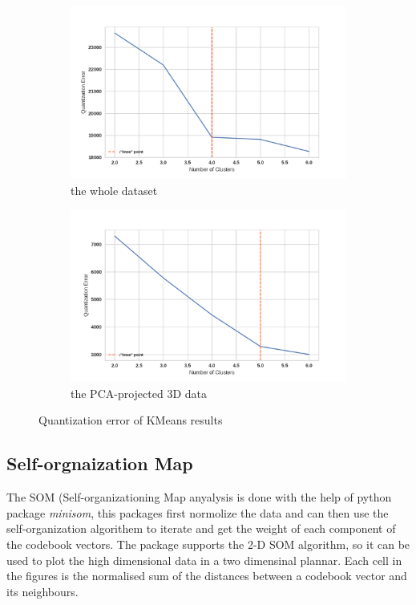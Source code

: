 \documentclass[12pt]{article}
\begin{document}
\begin{figure}
    \centering
    \begin{subfigure}[b]{0.47\textwidth}
        \includegraphics[width=\textwidth]{images/cluster-err1.png}
        \caption{the whole dataset}
        \label{fig:cluster-err1}
    \end{subfigure}
    \begin{subfigure}[b]{0.47\textwidth}
        \includegraphics[width=\textwidth]{images/cluster-err2.png}
        \caption{the PCA-projected 3D data}
        \label{fig:cluster-err2}
    \end{subfigure}
    \caption{Quantization error of KMeans results}\label{fig:cluster-err}
\end{figure} 
\subsection{Self-orgnaization Map}
The SOM (Self-organizationing Map anyalysis is done with the help of python package \textit{minisom}\cite{justglowing/minisom_2017}, this packages first normolize the data and can then use the self-organization algorithem to iterate and get the weight of each component of the codebook vectors. The package supports the 2-D SOM algorithm, so it can be used to plot the high dimensional data in a two dimensinal plannar. Each cell in the figures is the normalised sum of the distances between a codebook vector and its neighbours.\\
\end{document}
